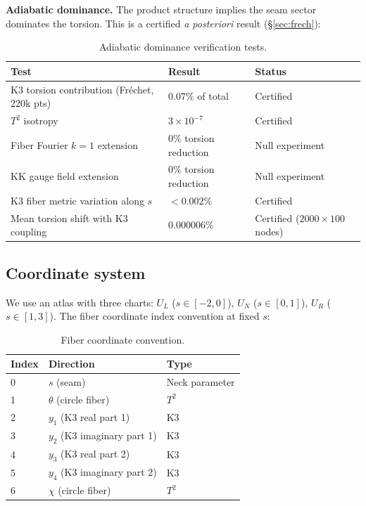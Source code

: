 \documentclass[11pt,a4paper]{article}
\theoremstyle{definition}
\theoremstyle{remark}
\begin{document}
\textbf{Adiabatic dominance.} The product structure implies the seam sector dominates the torsion. This is a certified \emph{a posteriori} result (§\ref{sec:frech}):

\begin{table}[ht]
\centering
\small
\begin{tabular}{lll}
\toprule
Test & Result & Status \\
\midrule
K3 torsion contribution (Fr\'echet, 220k pts) & $0.07\%$ of total & Certified \\
$T^2$ isotropy & $3 \times 10^{-7}$ & Certified \\
Fiber Fourier $k=1$ extension & $0\%$ torsion reduction & Null experiment \\
KK gauge field extension & $0\%$ torsion reduction & Null experiment \\
K3 fiber metric variation along $s$ & $< 0.002\%$ & Certified \\
Mean torsion shift with K3 coupling & $0.000006\%$ & Certified ($2000 \times 100$ nodes) \\
\bottomrule
\end{tabular}
\caption{Adiabatic dominance verification tests.}
\end{table}

\subsection{Coordinate system}

We use an atlas with three charts: $U_L$ ($s \in [-2, 0]$), $U_N$ ($s \in [0, 1]$), $U_R$ ($s \in [1, 3]$). The fiber coordinate index convention at fixed $s$:

\begin{table}[ht]
\centering
\begin{tabular}{lll}
\toprule
Index & Direction & Type \\
\midrule
0 & $s$ (seam) & Neck parameter \\
1 & $\theta$ (circle fiber) & $T^2$ \\
2 & $y_1$ (K3 real part 1) & K3 \\
3 & $y_2$ (K3 imaginary part 1) & K3 \\
4 & $y_3$ (K3 real part 2) & K3 \\
5 & $y_4$ (K3 imaginary part 2) & K3 \\
6 & $\chi$ (circle fiber) & $T^2$ \\
\bottomrule
\end{tabular}
\caption{Fiber coordinate convention.}
\end{table}
\end{document}
